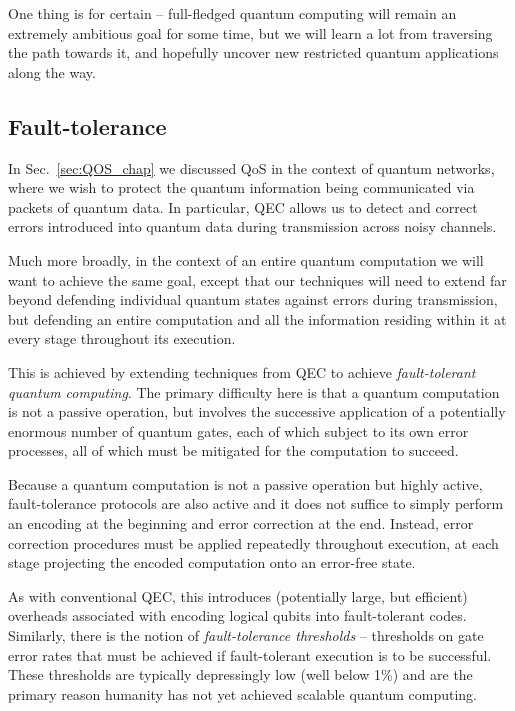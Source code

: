 One thing is for certain -- full-fledged quantum computing will remain an extremely ambitious goal for some time, but we will learn a lot from traversing the path towards it, and hopefully uncover new restricted quantum applications along the way.

%
%

\subsection{Fault-tolerance}\label{sec:fault_tolerance}


In Sec.~\ref{sec:QOS_chap} we discussed QoS in the context of quantum networks, where we wish to protect the quantum information being communicated via packets of quantum data. In particular, QEC allows us to detect and correct errors introduced into quantum data during transmission across noisy channels.

Much more broadly, in the context of an entire quantum computation we will want to achieve the same goal, except that our techniques will need to extend far beyond defending individual quantum states against errors during transmission, but defending an entire computation and all the information residing within it at every stage throughout its execution.

This is achieved by extending techniques from QEC to achieve \textit{fault-tolerant quantum computing}. The primary difficulty here is that a quantum computation is not a passive operation, but involves the successive application of a potentially enormous number of quantum gates, each of which subject to its own error processes, all of which must be mitigated for the computation to succeed.

Because a quantum computation is not a passive operation but highly active, fault-tolerance protocols are also active and it does not suffice to simply perform an encoding at the beginning and error correction at the end. Instead, error correction procedures must be applied repeatedly throughout execution, at each stage projecting the encoded computation onto an error-free state.

As with conventional QEC, this introduces (potentially large, but efficient) overheads associated with encoding logical qubits into fault-tolerant codes. Similarly, there is the notion of \textit{fault-tolerance thresholds} -- thresholds on gate error rates that must be achieved if fault-tolerant execution is to be successful. These thresholds are typically depressingly low (well below 1\%) and are the primary reason humanity has not yet achieved scalable quantum computing.